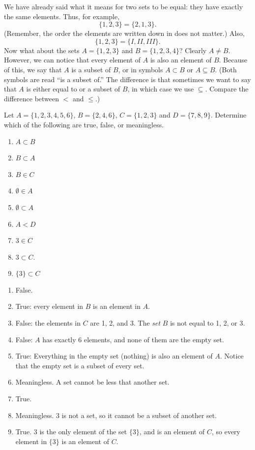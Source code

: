 \documentclass[12pt]{article}
\begin{document}
We have already said what it means for two sets to be equal: they have exactly the same elements.  Thus, for example,
\[ \{1, 2, 3\} = \{2, 1, 3\}.\]
(Remember, the order the elements are written down in does not matter.)  Also,
\[ \{1, 2, 3\} = \{I, II, III\}.\]
Now what about the sets $A = \{1, 2, 3\}$ and $B = \{1, 2, 3, 4\}$?  Clearly $A \ne B$.  However, we can notice that every element of $A$ is also an element of $B$.  Because of this, we say that $A$ is a subset of $B$, or in symbols $A \subset B$ or $A \subseteq B$.  (Both symbols are read ``is a subset of.'' The difference is that sometimes we want to say that $A$ is either equal to or a subset of $B$, in which case we use $\subseteq$.  Compare the difference between $<$ and $\le$.)

\begin{example}
 Let $A = \{1, 2, 3, 4, 5, 6\}$, $B = \{2, 4, 6\}$, $C = \{1, 2, 3\}$ and $D = \{7, 8, 9\}$.  Determine which of the following are true, false, or meaningless.
\begin{multicols}{3}
\begin{enumerate}
\item $A \subset B$
\item $B \subset A$
\item $B \in C$
\item $\emptyset \in A$
\item $\emptyset \subset A$
\item $A < D$
\item $3 \in C$
\item $3 \subset C$.
\item $\{3\} \subset C$
\end{enumerate}
\end{multicols}
\begin{solution}
 \begin{enumerate}
  \item False.
\item True: every element in $B$ is an element in $A$.
\item False: the elements in $C$ are 1, 2, and 3.  The {\em set} $B$ is not equal to 1, 2, or 3.
\item False: $A$ has exactly 6 elements, and none of them are the empty set.
\item True: Everything in the empty set (nothing) is also an element of $A$.  Notice that the empty set is a subset of every set.
\item Meaningless.  A set cannot be less that another set.
\item True.
\item Meaningless.  $3$ is not a set, so it cannot be a subset of another set.
\item True.  $3$ is the only element of the set $\{3\}$, and is an element of $C$, so every element in $\{3\}$ is an element of $C$.
 \end{enumerate}
\end{solution}
\end{example}
\end{document}
